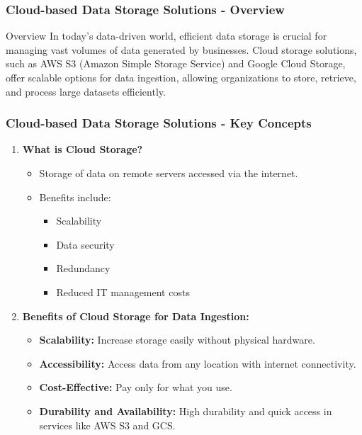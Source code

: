 \documentclass[aspectratio=169]{beamer}
\begin{document}
\begin{frame}[fragile]
    \frametitle{Cloud-based Data Storage Solutions - Overview}
    \begin{block}{Overview}
        In today's data-driven world, efficient data storage is crucial for managing vast volumes of data generated by businesses. Cloud storage solutions, such as AWS S3 (Amazon Simple Storage Service) and Google Cloud Storage, offer scalable options for data ingestion, allowing organizations to store, retrieve, and process large datasets efficiently.
    \end{block}
\end{frame}

\begin{frame}[fragile]
    \frametitle{Cloud-based Data Storage Solutions - Key Concepts}
    \begin{enumerate}
        \item \textbf{What is Cloud Storage?}
        \begin{itemize}
            \item Storage of data on remote servers accessed via the internet.
            \item Benefits include:
                \begin{itemize}
                    \item Scalability
                    \item Data security
                    \item Redundancy
                    \item Reduced IT management costs
                \end{itemize}
        \end{itemize}
        
        \item \textbf{Benefits of Cloud Storage for Data Ingestion:}
        \begin{itemize}
            \item \textbf{Scalability:} Increase storage easily without physical hardware.
            \item \textbf{Accessibility:} Access data from any location with internet connectivity.
            \item \textbf{Cost-Effective:} Pay only for what you use.
            \item \textbf{Durability and Availability:} High durability and quick access in services like AWS S3 and GCS.
        \end{itemize}
    \end{enumerate}
\end{frame}
\end{document}

